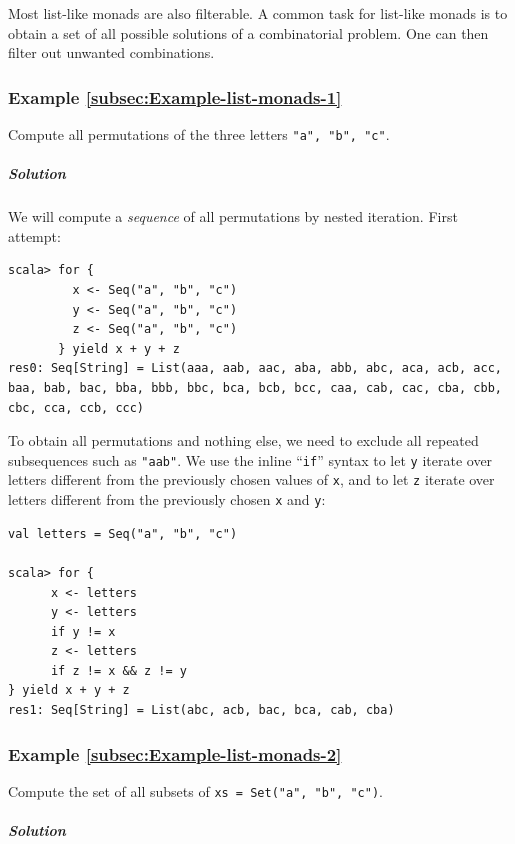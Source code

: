 Most list-like monads are also filterable. A common task for list-like
monads is to obtain a set of all possible solutions of a combinatorial
problem. One can then filter out unwanted combinations.

\subsubsection{Example \label{subsec:Example-list-monads-1}\ref{subsec:Example-list-monads-1}}

Compute all permutations of the three letters \lstinline!"a", "b", "c"!. 

\subparagraph{Solution}

We will compute a \emph{sequence} of all permutations by nested iteration.
First attempt:
\begin{lstlisting}
scala> for {
         x <- Seq("a", "b", "c")
         y <- Seq("a", "b", "c")
         z <- Seq("a", "b", "c")
       } yield x + y + z
res0: Seq[String] = List(aaa, aab, aac, aba, abb, abc, aca, acb, acc, baa, bab, bac, bba, bbb, bbc, bca, bcb, bcc, caa, cab, cac, cba, cbb, cbc, cca, ccb, ccc)
\end{lstlisting}
To obtain all permutations and nothing else, we need to exclude all
repeated subsequences such as \lstinline!"aab"!. We use the inline
\textsf{``}\lstinline!if!\textsf{''} syntax to let \lstinline!y! iterate over letters
different from the previously chosen values of \lstinline!x!, and
to let \lstinline!z! iterate over letters different from the previously
chosen \lstinline!x! and \lstinline!y!: 
\begin{lstlisting}
val letters = Seq("a", "b", "c")

scala> for {
      x <- letters
      y <- letters
      if y != x
      z <- letters
      if z != x && z != y
} yield x + y + z
res1: Seq[String] = List(abc, acb, bac, bca, cab, cba) 
\end{lstlisting}


\subsubsection{Example \label{subsec:Example-list-monads-2}\ref{subsec:Example-list-monads-2}}

Compute the set of all subsets of \lstinline!xs = Set("a", "b", "c")!. 

\subparagraph{Solution}


